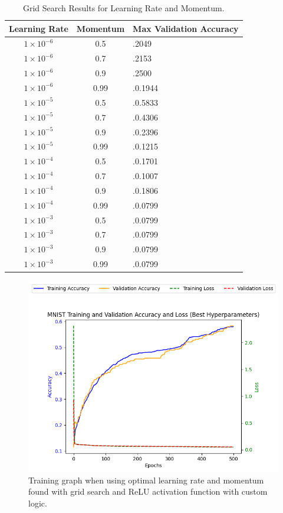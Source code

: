 \documentclass[letterpaper]{article}
\begin{document}
\begin{table}[h]
    \centering
    \small %
    \begin{tabularx}{\columnwidth}{|c|c|X|}
    \hline
    Learning Rate & Momentum & Max Validation Accuracy \\
    \hline
    $1 \times 10^{-6}$ & 0.5 & .2049 \\
    $1 \times 10^{-6}$ & 0.7 & .2153 \\
    $1 \times 10^{-6}$ & 0.9 & .2500 \\
    $1 \times 10^{-6}$ & 0.99 & .0.1944 \\
    $1 \times 10^{-5}$ & 0.5 & .0.5833 \\
    $1 \times 10^{-5}$ & 0.7 & .0.4306 \\
    $1 \times 10^{-5}$ & 0.9 & .0.2396 \\
    $1 \times 10^{-5}$ & 0.99 & .0.1215 \\
    $1 \times 10^{-4}$ & 0.5 & .0.1701 \\
    $1 \times 10^{-4}$ & 0.7 & .0.1007 \\
    $1 \times 10^{-4}$ & 0.9 & .0.1806 \\
    $1 \times 10^{-4}$ & 0.99 & .0.0799 \\
    $1 \times 10^{-3}$ & 0.5 & .0.0799 \\
    $1 \times 10^{-3}$ & 0.7 & .0.0799 \\
    $1 \times 10^{-3}$ & 0.9 & .0.0799 \\
    $1 \times 10^{-3}$ & 0.99 & .0.0799 \\
    \hline
    \end{tabularx}
    \caption{Grid Search Results for Learning Rate and Momentum.}
    \label{table:grid_search}
    \end{table}
    
    

\begin{figure}[h]
    \centering
    \includegraphics[width=0.8\linewidth]{momentum_grid_search.png} %
    \caption{Training graph when using optimal learning rate and momentum found with grid search and ReLU activation function with custom logic.}
    \label{fig:momentum_grid_search}
\end{figure}
\end{document}
